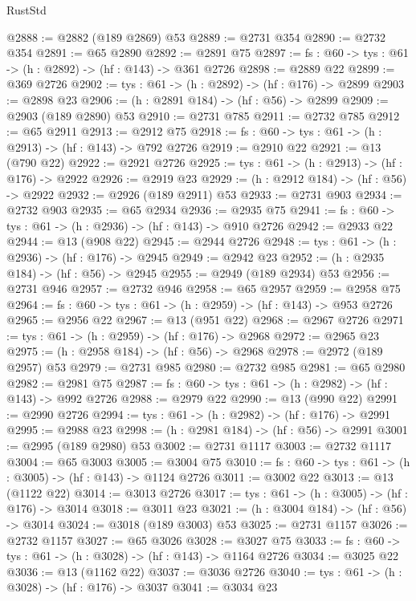 \begin{lexlean}{RustStd}
\begin{coremodule}
@2888 := @2882 (@189 @2869) @53
@2889 := @2731 @354
@2890 := @2732 @354
@2891 := @65 @2890
@2892 := @2891 @75
@2897 := {fs : @60} -> {tys : @61} -> (h : @2892) -> (hf : @143) -> @361 @2726
@2898 := @2889 @22
@2899 := @369 @2726
@2902 := {tys : @61} -> (h : @2892) -> (hf : @176) -> @2899
@2903 := @2898 @23
@2906 := (h : @2891 @184) -> (hf : @56) -> @2899
@2909 := @2903 (@189 @2890) @53
@2910 := @2731 @785
@2911 := @2732 @785
@2912 := @65 @2911
@2913 := @2912 @75
@2918 := {fs : @60} -> {tys : @61} -> (h : @2913) -> (hf : @143) -> @792 @2726
@2919 := @2910 @22
@2921 := @13 (@790 @22)
@2922 := @2921 @2726
@2925 := {tys : @61} -> (h : @2913) -> (hf : @176) -> @2922
@2926 := @2919 @23
@2929 := (h : @2912 @184) -> (hf : @56) -> @2922
@2932 := @2926 (@189 @2911) @53
@2933 := @2731 @903
@2934 := @2732 @903
@2935 := @65 @2934
@2936 := @2935 @75
@2941 := {fs : @60} -> {tys : @61} -> (h : @2936) -> (hf : @143) -> @910 @2726
@2942 := @2933 @22
@2944 := @13 (@908 @22)
@2945 := @2944 @2726
@2948 := {tys : @61} -> (h : @2936) -> (hf : @176) -> @2945
@2949 := @2942 @23
@2952 := (h : @2935 @184) -> (hf : @56) -> @2945
@2955 := @2949 (@189 @2934) @53
@2956 := @2731 @946
@2957 := @2732 @946
@2958 := @65 @2957
@2959 := @2958 @75
@2964 := {fs : @60} -> {tys : @61} -> (h : @2959) -> (hf : @143) -> @953 @2726
@2965 := @2956 @22
@2967 := @13 (@951 @22)
@2968 := @2967 @2726
@2971 := {tys : @61} -> (h : @2959) -> (hf : @176) -> @2968
@2972 := @2965 @23
@2975 := (h : @2958 @184) -> (hf : @56) -> @2968
@2978 := @2972 (@189 @2957) @53
@2979 := @2731 @985
@2980 := @2732 @985
@2981 := @65 @2980
@2982 := @2981 @75
@2987 := {fs : @60} -> {tys : @61} -> (h : @2982) -> (hf : @143) -> @992 @2726
@2988 := @2979 @22
@2990 := @13 (@990 @22)
@2991 := @2990 @2726
@2994 := {tys : @61} -> (h : @2982) -> (hf : @176) -> @2991
@2995 := @2988 @23
@2998 := (h : @2981 @184) -> (hf : @56) -> @2991
@3001 := @2995 (@189 @2980) @53
@3002 := @2731 @1117
@3003 := @2732 @1117
@3004 := @65 @3003
@3005 := @3004 @75
@3010 := {fs : @60} -> {tys : @61} -> (h : @3005) -> (hf : @143) -> @1124 @2726
@3011 := @3002 @22
@3013 := @13 (@1122 @22)
@3014 := @3013 @2726
@3017 := {tys : @61} -> (h : @3005) -> (hf : @176) -> @3014
@3018 := @3011 @23
@3021 := (h : @3004 @184) -> (hf : @56) -> @3014
@3024 := @3018 (@189 @3003) @53
@3025 := @2731 @1157
@3026 := @2732 @1157
@3027 := @65 @3026
@3028 := @3027 @75
@3033 := {fs : @60} -> {tys : @61} -> (h : @3028) -> (hf : @143) -> @1164 @2726
@3034 := @3025 @22
@3036 := @13 (@1162 @22)
@3037 := @3036 @2726
@3040 := {tys : @61} -> (h : @3028) -> (hf : @176) -> @3037
@3041 := @3034 @23

\end{coremodule}
\end{lexlean}
